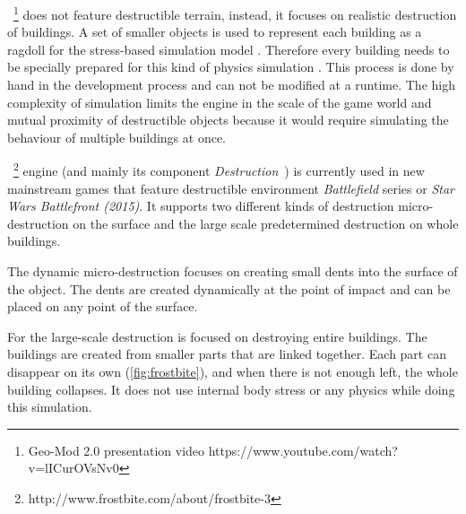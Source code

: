 ~\cite{geomod}\footnote{Geo-Mod 2.0 presentation video https://www.youtube.com/watch?v=lICurOVsNv0} does not feature destructible terrain, instead, it focuses on realistic destruction of buildings. A set of smaller objects is used to represent each building as a ragdoll for the stress-based simulation model . Therefore every building needs to be specially prepared for this kind of physics simulation . This process is done by hand in the development process and can not be modified at a runtime. The high complexity of simulation limits the engine in the scale of the game world and mutual proximity of destructible objects because  it would require simulating the behaviour of multiple buildings at once.


~\footnote{http://www.frostbite.com/about/frostbite-3} engine (and mainly its component \emph{Destruction}~\cite{destruction}) is currently used in new mainstream games that feature destructible environment \eg \emph{Battlefield} series or \emph{Star Wars Battlefront (2015)}. It supports two different kinds of destruction micro-destruction on the surface and the large scale predetermined destruction on whole buildings. 

The dynamic micro-destruction focuses on creating small dents into the surface of the object. The dents are created dynamically at the point of impact and can be placed on any point of the surface.

For the large-scale destruction is focused  on destroying entire buildings. The buildings are created from smaller parts that are linked together. Each part can disappear on its own (\cref{fig:frostbite}), and when there is not enough  left, the whole building collapses. It does not use internal body stress or any physics  while doing this simulation. 

